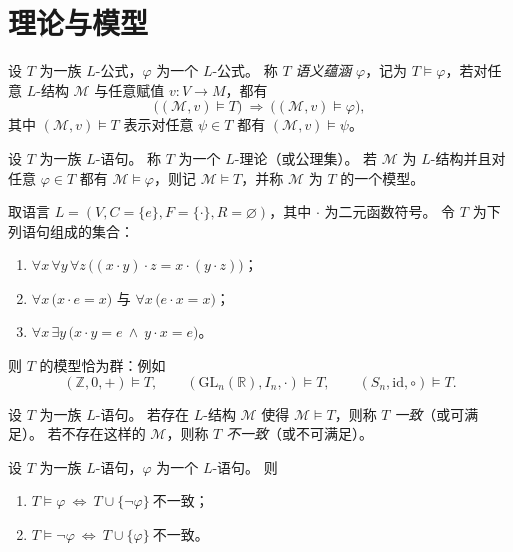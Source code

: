 \documentclass[lang=cn,a4paper,newtx,section]{elegantbook}
\begin{document}
\section{理论与模型}

 \begin{definition}[语义蕴涵]
 \label{semantic-entailment}
 设 $T$ 为一族 $L$-公式，$\varphi$ 为一个 $L$-公式。
 称 $T$ \emph{语义蕴涵} $\varphi$，记为 $T\models\varphi$，若对任意 $L$-结构 $\mathcal M$ 与任意赋值 $v:V\to M$，都有
 \[
   \bigl((\mathcal M,v)\models T\bigr)\ \Longrightarrow\ \bigl((\mathcal M,v)\models\varphi\bigr),
 \]
 其中 $(\mathcal M,v)\models T$ 表示对任意 $\psi\in T$ 都有 $(\mathcal M,v)\models\psi$。
 \end{definition}

 \begin{definition}[理论与模型]
 \label{theory-and-model}
 设 $T$ 为一族 $L$-语句。
 称 $T$ 为一个 $L$-理论（或公理集）。
 若 $\mathcal M$ 为 $L$-结构并且对任意 $\varphi\in T$ 都有 $\mathcal M\models\varphi$，则记 $\mathcal M\models T$，并称 $\mathcal M$ 为 $T$ 的一个模型。
 \end{definition}

 \begin{example}[群论公理]
 \label{example:group-theory}
 取语言 $L=(V, C=\{e\}, F=\{\cdot\}, R=\varnothing)$，其中 $\cdot$ 为二元函数符号。
 令 $T$ 为下列语句组成的集合：
 \begin{enumerate}
   \item $\forall x\,\forall y\,\forall z\,\bigl((x\cdot y)\cdot z=x\cdot(y\cdot z)\bigr)$；
   \item $\forall x\,\bigl(x\cdot e=x\bigr)$ 与 $\forall x\,\bigl(e\cdot x=x\bigr)$；
   \item $\forall x\,\exists y\,\bigl(x\cdot y=e\ \wedge\ y\cdot x=e\bigr)$。
 \end{enumerate}
 则 $T$ 的模型恰为群：例如
 \[
   (\mathbb Z,0,+)\models T,\qquad (\mathrm{GL}_n(\mathbb R),I_n,\cdot)\models T,\qquad (S_n,\mathrm{id},\circ)\models T.
 \]
 \end{example}

 \begin{definition}[一致与不一致]
 \label{consistency}
 设 $T$ 为一族 $L$-语句。
 若存在 $L$-结构 $\mathcal M$ 使得 $\mathcal M\models T$，则称 $T$ \emph{一致}（或可满足）。
 若不存在这样的 $\mathcal M$，则称 $T$ \emph{不一致}（或不可满足）。
 \end{definition}

 \begin{proposition}
 \label{entailment-and-inconsistency}
 设 $T$ 为一族 $L$-语句，$\varphi$ 为一个 $L$-语句。
 则
 \begin{enumerate}
   \item $T\models\varphi\ \Longleftrightarrow\ T\cup\{\neg\varphi\}\ \text{不一致}$；
   \item $T\models\neg\varphi\ \Longleftrightarrow\ T\cup\{\varphi\}\ \text{不一致}$。
 \end{enumerate}
 \end{proposition}
\end{document}
